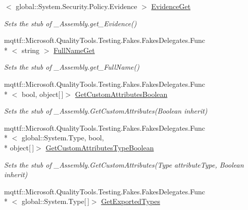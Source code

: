 \begin{DoxyCompactItemize}
$<$ global\-::\-System.\-Security.\-Policy.\-Evidence $>$ \hyperlink{class_system_1_1_runtime_1_1_interop_services_1_1_fakes_1_1_stub___assembly_a2076b2d2b01d807c8752a075206237cd}{Evidence\-Get}
\begin{DoxyCompactList}\small\item\em Sets the stub of \-\_\-\-Assembly.\-get\-\_\-\-Evidence()\end{DoxyCompactList}\item 
mqttf\-::\-Microsoft.\-Quality\-Tools.\-Testing.\-Fakes.\-Fakes\-Delegates.\-Func\\*
$<$ string $>$ \hyperlink{class_system_1_1_runtime_1_1_interop_services_1_1_fakes_1_1_stub___assembly_a353c55f2e6ab4ec58232ff26fea6717a}{Full\-Name\-Get}
\begin{DoxyCompactList}\small\item\em Sets the stub of \-\_\-\-Assembly.\-get\-\_\-\-Full\-Name()\end{DoxyCompactList}\item 
mqttf\-::\-Microsoft.\-Quality\-Tools.\-Testing.\-Fakes.\-Fakes\-Delegates.\-Func\\*
$<$ bool, object\mbox{[}$\,$\mbox{]}$>$ \hyperlink{class_system_1_1_runtime_1_1_interop_services_1_1_fakes_1_1_stub___assembly_a83570ec6dc2471136e9acc8a43394738}{Get\-Custom\-Attributes\-Boolean}
\begin{DoxyCompactList}\small\item\em Sets the stub of \-\_\-\-Assembly.\-Get\-Custom\-Attributes(\-Boolean inherit)\end{DoxyCompactList}\item 
mqttf\-::\-Microsoft.\-Quality\-Tools.\-Testing.\-Fakes.\-Fakes\-Delegates.\-Func\\*
$<$ global\-::\-System.\-Type, bool, \\*
object\mbox{[}$\,$\mbox{]}$>$ \hyperlink{class_system_1_1_runtime_1_1_interop_services_1_1_fakes_1_1_stub___assembly_ad793f0ad8235534611a7b7b73130ee59}{Get\-Custom\-Attributes\-Type\-Boolean}
\begin{DoxyCompactList}\small\item\em Sets the stub of \-\_\-\-Assembly.\-Get\-Custom\-Attributes(\-Type attribute\-Type, Boolean inherit)\end{DoxyCompactList}\item 
mqttf\-::\-Microsoft.\-Quality\-Tools.\-Testing.\-Fakes.\-Fakes\-Delegates.\-Func\\*
$<$ global\-::\-System.\-Type\mbox{[}$\,$\mbox{]}$>$ \hyperlink{class_system_1_1_runtime_1_1_interop_services_1_1_fakes_1_1_stub___assembly_aff0f6f1aca039ee26cc94426beb5d251}{Get\-Exported\-Types}

\end{DoxyCompactItemize}
